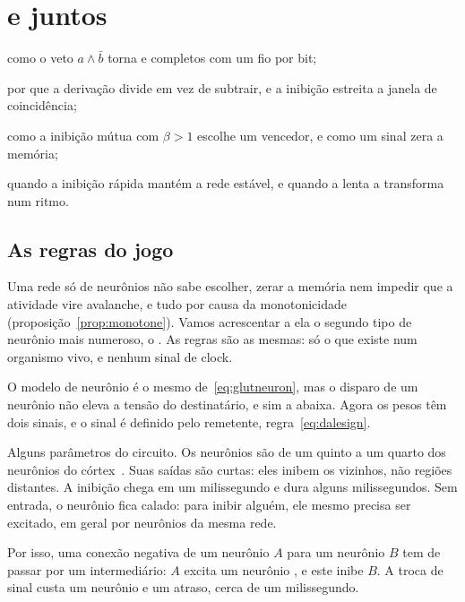 \chapter{ e  juntos}
\label{sec:gaba}
\begin{chaptergoals}
\item como o veto $a\wedge\bar b$ torna  e  completos com um fio por bit;
\item por que a derivação divide em vez de subtrair, e a inibição estreita a janela de coincidência;
\item como a inibição mútua com $\beta>1$ escolhe um vencedor, e como um sinal zera a memória;
\item quando a inibição rápida mantém a rede estável, e quando a lenta a transforma num ritmo.
\end{chaptergoals}

\section{As regras do jogo}

Uma rede só de neurônios  não sabe escolher, zerar a memória nem impedir que a atividade vire avalanche, e tudo por causa da monotonicidade (proposição~\ref{prop:monotone}). Vamos acrescentar a ela o segundo tipo de neurônio mais numeroso, o . As regras são as mesmas: só o que existe num organismo vivo, e nenhum sinal de clock.

O modelo de neurônio é o mesmo de~\eqref{eq:glutneuron}, mas o disparo de um neurônio  não eleva a tensão do destinatário, e sim a abaixa. Agora os pesos têm dois sinais, e o sinal é definido pelo remetente, regra~\eqref{eq:dalesign}.

Alguns parâmetros do circuito. Os neurônios  são de um quinto a um quarto dos neurônios do córtex~\cite{Hendry1987}. Suas saídas são curtas: eles inibem os vizinhos, não regiões distantes. A inibição chega em um milissegundo e dura alguns milissegundos. Sem entrada, o neurônio  fica calado: para inibir alguém, ele mesmo precisa ser excitado, em geral por neurônios  da mesma rede.

Por isso, uma conexão negativa de um neurônio  $A$ para um neurônio $B$ tem de passar por um intermediário: $A$ excita um neurônio , e este inibe $B$. A troca de sinal custa um neurônio e um atraso, cerca de um milissegundo.

